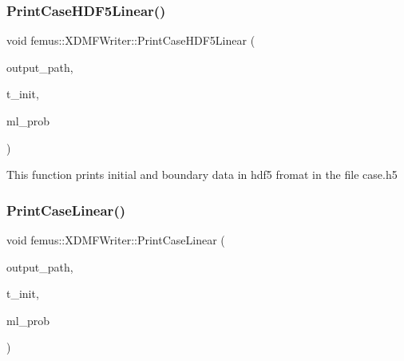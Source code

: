 \mbox{\label{classfemus_1_1_x_d_m_f_writer_a3eee94cc377569e0284241a7e91110e6}} 
\subsubsection{\texorpdfstring{Print\+Case\+H\+D\+F5\+Linear()}{PrintCaseHDF5Linear()}}
{\footnotesize\ttfamily void femus\+::\+X\+D\+M\+F\+Writer\+::\+Print\+Case\+H\+D\+F5\+Linear (\begin{DoxyParamCaption}\item[{const std\+::string}]{output\+\_\+path,  }\item[{const \mbox{\hyperlink{_typedefs_8hpp_a91ad9478d81a7aaf2593e8d9c3d06a14}{uint}}}]{t\+\_\+init,  }\item[{const \mbox{\hyperlink{classfemus_1_1_multi_level_problem}{Multi\+Level\+Problem}} \&}]{ml\+\_\+prob }\end{DoxyParamCaption})\hspace{0.3cm}{\ttfamily [static]}}

This function prints initial and boundary data in hdf5 fromat in the file case.\+h5 \mbox{\label{classfemus_1_1_x_d_m_f_writer_ab75b676d35a4f411608e45ef578d3c7e}} 
\subsubsection{\texorpdfstring{Print\+Case\+Linear()}{PrintCaseLinear()}}
{\footnotesize\ttfamily void femus\+::\+X\+D\+M\+F\+Writer\+::\+Print\+Case\+Linear (\begin{DoxyParamCaption}\item[{const std\+::string}]{output\+\_\+path,  }\item[{const \mbox{\hyperlink{_typedefs_8hpp_a91ad9478d81a7aaf2593e8d9c3d06a14}{uint}}}]{t\+\_\+init,  }\item[{const \mbox{\hyperlink{classfemus_1_1_multi_level_problem}{Multi\+Level\+Problem}} \&}]{ml\+\_\+prob }\end{DoxyParamCaption})\hspace{0.3cm}{\ttfamily [static]}}



